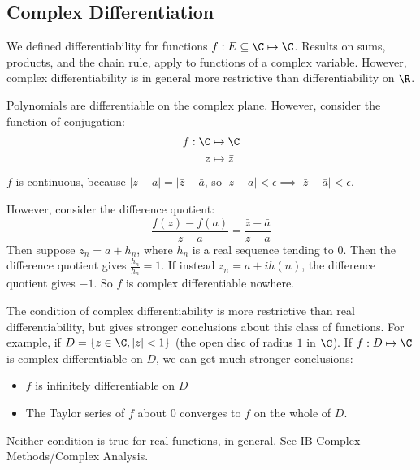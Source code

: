 \documentclass[../Main.tex]{subfiles}
\begin{document}
\subsection{Complex Differentiation}
We defined differentiability for functions $f: E\subseteq \C \mapsto \C$. Results on sums, products, and the chain rule, apply to functions of a complex variable. However, complex differentiability is in general more restrictive than differentiability on $\R$.
\begin{example}
    Polynomials are differentiable on the complex plane. However, consider the function of conjugation:
    \begin{align*}
        f : \C &\mapsto \C \\
        z &\mapsto \bar{z}
    \end{align*}
    $f$ is continuous, because $|z - a| = |\bar{z} - \bar{a}$, so $|z - a| < \epsilon \implies |\bar{z} - \bar{a}| < \epsilon$.\par
    However, consider the difference quotient:
    \begin{equation*}
        \frac{f(z) - f(a)}{z - a} = \frac{\bar{z} - \bar{a}}{z - a}
    \end{equation*}
    Then suppose $z_n = a + h_n$, where $h_n$ is a real sequence tending to $0$. Then the difference quotient gives $\frac{h_n}{h_n} = 1$. If instead $z_n = a + ih(n)$, the difference quotient gives $-1$. So $f$ is complex differentiable nowhere.
\end{example}
The condition of complex differentiability is more restrictive than real differentiability, but gives stronger conclusions about this class of functions. For example, if $D = \{z \in \C, |z| < 1\}$ (the open disc of radius $1$ in $\C$). If $f : D \mapsto \C$ is complex differentiable on $D$, we can get much stronger conclusions:
\begin{itemize}
    \item $f$ is infinitely differentiable on $D$
    \item The Taylor series of $f$ about $0$ converges to $f$ on the whole of $D$.
\end{itemize}
Neither condition is true for real functions, in general. See IB Complex Methods/Complex Analysis.
\end{document}
